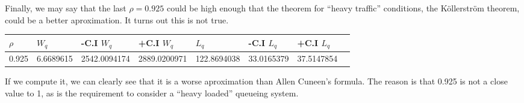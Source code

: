 \documentclass[]{article}
\begin{document}
Finally, we may say that the last \(\rho=0.925\) could be high enough
that the theorem for ``heavy traffic'' conditions, the Köllerström
theorem, could be a better aproximation. It turns out this is not true.

\begin{longtable}[]{@{}llllllll@{}}
\toprule
\(\rho\) & \(W_{q}\) & -C.I \(W_{q}\) & +C.I \(W_{q}\) & \(L_{q}\) &
-C.I \(L_{q}\) & +C.I \(L_{q}\) &\tabularnewline
\midrule
\endhead
0.925 & 6.6689615 & 2542.0094174 & 2889.0200971 & 122.8694038 &
33.0165379 & 37.5147854\tabularnewline
\bottomrule
\end{longtable}

If we compute it, we can clearly see that it is a worse aproximation
than Allen Cuneen's formula. The reason is that 0.925 is not a close
value to 1, as is the requirement to consider a ``heavy loaded''
queueing system.
\end{document}

